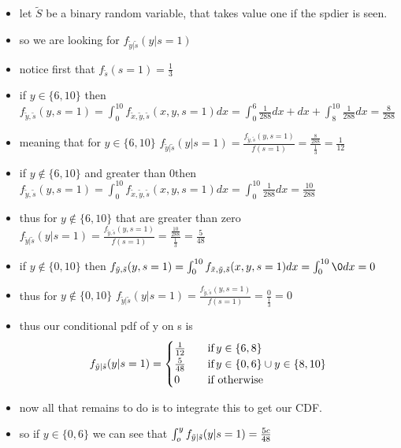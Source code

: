 \documentclass[12pt,twoside]{article}
\begin{document}
\begin{enumerate}
\begin{enumerate}
\begin{itemize}
    \item let $\tilde{S}$ be a binary random variable, that takes value one if the spdier is seen. 
    \item so we are looking for $f_{\tilde{y}|\tilde{s}}(y|s=1)$
    \item notice first that $f_{\tilde{s}}(s=1)=\frac{1}{3}$ 
    \item if $y\in\{6,10\}$ then $f_{\tilde{y},\tilde{s}}(y,s=1)=\int_{0}^{10}f_{\tilde{x},\tilde{y},\tilde{s}}(x,y,s=1)dx=\int_{0}^{6}\frac{1}{288}dx+dx+\int_{8}^{10}\frac{1}{288}dx=\frac{8}{288}$
    \item meaning that for $y\in\{6,10\}$  $f_{\tilde{y}|\tilde{s}}(y|s=1)=\frac{f_{\tilde{y},\tilde{s}}(y,s=1)}{f(s=1)}=\frac{\frac{8}{288}}{\frac{1}{3}}=\frac{1}{12}$
    \item if $y\not\in\{6,10\}$ and greater than 0then $f_{\tilde{y},\tilde{s}}(y,s=1)=\int_{0}^{10}f_{\tilde{x},\tilde{y},\tilde{s}}(x,y,s=1)dx=\int_{0}^{10}\frac{1}{288}dx=\frac{10}{288}$
    \item thus for $y\not\in\{6,10\}$  that are greater than zero 
    $f_{\tilde{y}|\tilde{s}}(y|s=1)=\frac{f_{\tilde{y},\tilde{s}}(y,s=1)}{f(s=1)}=\frac{\frac{10}{288}}{\frac{1}{3}}=\frac{5}{48}$
    \item if $y\not\in\{0,10\}$ then $f_{\tilde{y},\tilde{s}}(y,s=1)=\int_{0}^{10}f_{\tilde{x},\tilde{y},\tilde{s}}(x,y,s=1)dx=\int_{0}^{10}\0dx=0$
     \item thus for $y\not\in\{0,10\}$ 
    $f_{\tilde{y}|\tilde{s}}(y|s=1)=\frac{f_{\tilde{y},\tilde{s}}(y,s=1)}{f(s=1)}=\frac{0}{\frac{1}{3}}=0$
            \item thus our conditional pdf of y on s is
        \begin{equation*}
f_{ \Tilde{y} |\tilde{s}}(y|s=1)=\begin{cases}
        \frac{1}{12} \quad &\text{if} \,  y\in\{6,8\} \\
          \frac{5}{48} \quad &\text{if} \,  y\in\{0,6\} \cup y\in\{8,10\}  \\
         0 & \text{if } \text{otherwise}   \\
     \end{cases}
\end{equation*}
\item now all that remains to do is to integrate this to get our CDF. 
\item so if $y\in \{0,6\}$ we can see that $\int_{o}^{y}f_{ \Tilde{y} |\tilde{s}}(y|s=1)=\frac{5c}{48}$

\end{itemize}
\end{enumerate}
\end{enumerate}
\end{document}
